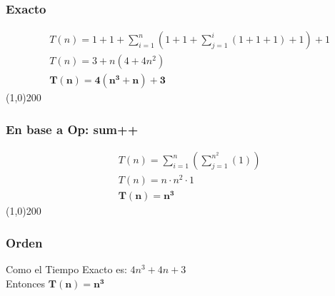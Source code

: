 \documentclass[letterpaper, fleqn]{report}
\begin{document}
\subsubsection*{Exacto}
\begin{align*}
&T(n) = 1+1+\sum_{i=1}^{n}\left(1+1+\sum_{j=1}^{i}{(1+1+1)}+1\right) + 1\\
&T(n) = 3 + n(4 + 4n^2)\\ 
&\mathbf{T(n) = 4(n^3+n)+3}
\end{align*}
\line(1,0){200}
\subsubsection*{En base a Op: sum++}
\begin{align*}
&T(n) = \sum_{i=1}^{n}\left(\sum_{j=1}^{n^2}(1)\right)\\
&T(n) = n \cdot n^2 \cdot 1\\
&\mathbf{T(n) = n^3}
\end{align*}
\line(1,0){200}
\subsubsection*{Orden}
Como el Tiempo Exacto es: $\displaystyle 4n^3 + 4n + 3$\\
Entonces $\mathbf{T(n) = n^3}$
\pagebreak
\end{document}
